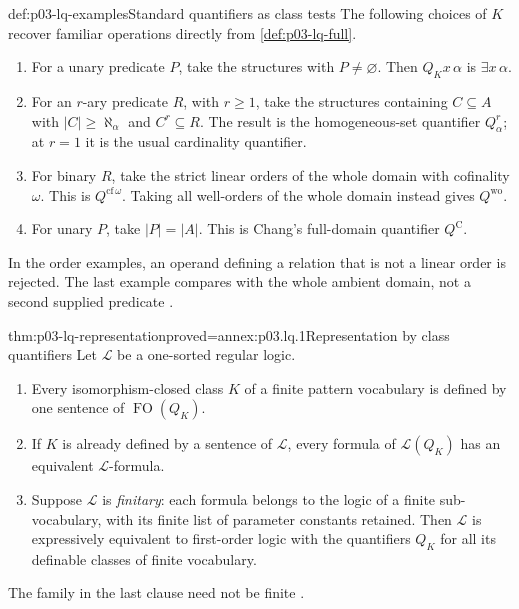\begin{hbexample}{def:p03-lq-examples}{Standard quantifiers as class tests}
The following choices of \(K\) recover familiar operations directly
from \cref{def:p03-lq-full}.
\begin{enumerate}
 \item For a unary predicate \(P\), take the structures with
       \(P\ne\varnothing\). Then \(Q_Kx\,\alpha\) is
       \(\exists x\,\alpha\).
 \item For an \(r\)-ary predicate \(R\), with \(r\geq1\), take the structures
       containing \(C\subseteq A\) with \(|C|\geq\aleph_\alpha\)
       and \(C^r\subseteq R\). The result is the homogeneous-set
       quantifier \(Q^r_\alpha\); at \(r=1\) it is the usual
       cardinality quantifier.
 \item For binary \(R\), take the strict linear orders of the whole
       domain with cofinality \(\omega\). This is
       \(Q^{\mathrm{cf}\,\omega}\). Taking all well-orders of the
       whole domain instead gives \(Q^{\mathrm{wo}}\).
 \item For unary \(P\), take \(|P|=|A|\). This is Chang's
       full-domain quantifier \(Q^{\mathrm C}\).
\end{enumerate}
In the order examples, an operand defining a relation that is not a
linear order is rejected. The last example compares with the whole
ambient domain, not a second supplied predicate
\cite[Ch.~II, Example~4.1.2, p.~50]{Ebbinghaus1985ExtendedLogics}.
\end{hbexample}

\begin{hbtheorem}{thm:p03-lq-representation}{proved=annex:p03.lq.1}{Representation by class quantifiers}
Let \(\mathscr L\) be a one-sorted regular logic.
\begin{enumerate}
 \item Every isomorphism-closed class \(K\) of a finite pattern
       vocabulary is defined by one sentence of
       \(\operatorname{FO}(Q_K)\).
 \item If \(K\) is already defined by a sentence of \(\mathscr L\),
       every formula of \(\mathscr L(Q_K)\) has an equivalent
       \(\mathscr L\)-formula.
 \item Suppose \(\mathscr L\) is \emph{finitary}: each formula
       belongs to the logic of a finite sub-vocabulary, with its
       finite list of parameter constants retained. Then
       \(\mathscr L\) is expressively equivalent to first-order
       logic with the quantifiers \(Q_K\) for all its definable
       classes of finite vocabulary.
\end{enumerate}
The family in the last clause need not be finite
\cite[Ch.~II, Theorem~4.1.3, p.~51]{Ebbinghaus1985ExtendedLogics}.
\end{hbtheorem}

